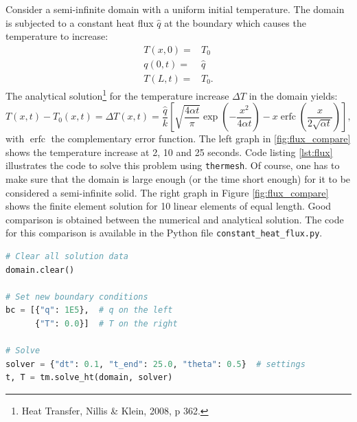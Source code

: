 \documentclass[10pt, a4paper, twoside, headinclude,footinclude, BCOR5mm]{scrartcl}
\DeclareMathOperator{\erfc}{erfc}
\begin{document}
Consider a semi-infinite domain with a uniform initial temperature. The domain is subjected to a constant heat flux \(\hat{q}\) at the boundary which causes the temperature to increase:
\begin{eqnarray*}
  T(x, 0) =& T_0\\
  q(0, t) =& \hat{q}\\
  T(L, t) =& T_0.
\end{eqnarray*}
The analytical solution\footnote{Heat Transfer, Nillis \& Klein, 2008, p 362.} for the temperature increase \(\Delta T\) in the domain yields:
\begin{equation*}
T(x,t) - T_0(x,t) =
\Delta T(x,t) = \frac{\hat{q}}{k} \left[
                \sqrt{\frac{4\alpha t}{\pi}}
                \exp \left( -\frac{x^2}{4\alpha t} \right)-
                x \erfc \left( \frac{x}{2\sqrt{\alpha t}} \right)
                \right],
\end{equation*}
with \(\erfc\) the complementary error function. The left graph in \ref{fig:flux_compare} shows the temperature increase at 2, 10 and 25 seconds. Code listing \ref{lst:flux} illustrates the code to solve this problem using \texttt{thermesh}. Of course, one has to make sure that the domain is large enough (or the time short enough) for it to be considered a semi-infinite solid. The right graph in Figure \ref{fig:flux_compare} shows the finite element solution for 10 linear elements of equal length. Good comparison is obtained between the numerical and analytical solution. The code for this comparison is available in the Python file \texttt{constant\_heat\_flux.py}.

\lstset{basicstyle=\ttfamily}
\begin{minipage}{\linewidth}
\label{code:flux}
\begin{lstlisting}[language=Python, caption=Thermesh example for a constant heat flux at one end., label={lst:flux}, backgroundcolor=\color{light-gray}]
# Clear all solution data
domain.clear()

# Set new boundary conditions
bc = [{"q": 1E5},  # q on the left
      {"T": 0.0}]  # T on the right

# Solve
solver = {"dt": 0.1, "t_end": 25.0, "theta": 0.5}  # settings
t, T = tm.solve_ht(domain, solver)
\end{lstlisting}
\end{minipage}
\end{document}
